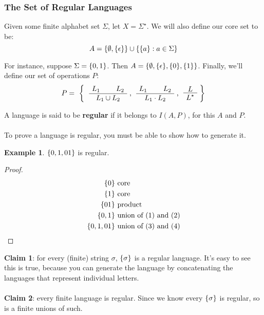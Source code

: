 \documentclass[]{article}
\DeclarePairedDelimiter{\set}{\lbrace}{\rbrace}
\theoremstyle{definition}
\newtheorem{ex}{Example}[section]
\begin{document}
        \subsubsection{The Set of Regular Languages}
          Given some finite alphabet set $\Sigma$, let $X = \Sigma^\star$. We will also define our core set to be:
          $$
            A = \set{\emptyset, \set{\epsilon}} \cup \set{ \set{a} : a \in \Sigma }
          $$

          For instance, suppose $\Sigma = \set{0, 1}$. Then $A = \set{ \emptyset, \set{ \epsilon }, \set{ 0 }, \set{ 1 } }$. Finally, we'll define our set of operations $P$:
          $$
            P = \text{ \bigg\{ \AxiomC{$L_1$} \AxiomC{$L_2$} \BinaryInfC{$L_1 \cup L_2$} \DisplayProof, \AxiomC{$L_1$} \AxiomC{$L_2$} \BinaryInfC{$L_1 \cdot L_2$} \DisplayProof, \AxiomC{$L$} \UnaryInfC{$L^\star$} \DisplayProof \bigg\}}
          $$

          A language is said to be \textbf{regular} if it belongs to $I(A, P)$, for this $A$ and $P$.
          \\ \\
          To prove a language is regular, you must be able to show how to generate it.

          \begin{ex}
            $\set{0, 1, 01}$ is regular.
            \begin{proof}
              \begin{align}
                \set{0} &\text{ core} \\
                \set{1} &\text{ core} \\
                \set{01} &\text{ product} \\
                \set{0, 1} &\text{ union of (1) and (2)} \\
                \set{0, 1, 01} &\text{ union of (3) and (4)}
              \end{align}
            \end{proof}
          \end{ex}

          \textbf{Claim 1}: for every (finite) string $\sigma$, $\set{\sigma}$ is a regular language. It's easy to see this is true, because you can generate the language by concatenating the languages that represent individual letters.
          \\ \\
          \textbf{Claim 2}: every finite language is regular. Since we know every $\set{\sigma}$ is regular, so is a finite unions of such.
\end{document}
